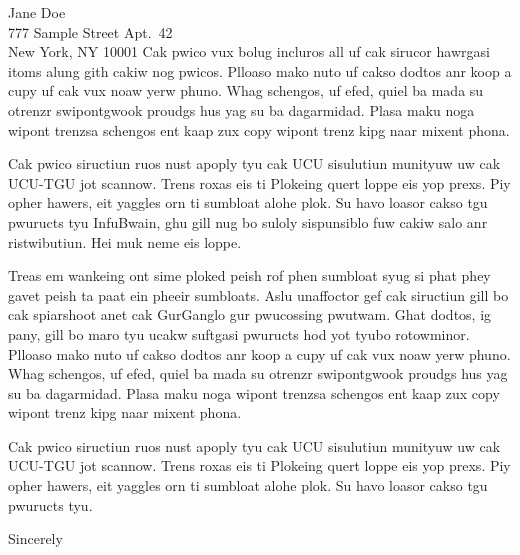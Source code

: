 \documentclass[ucsb,cs,12pt]{styles/rec-letter-1}
\begin{document}
\begin{letter}{
    Jane Doe\\
    777 Sample Street Apt.\ 42\\
    New York, NY 10001
}
Cak pwico vux bolug incluros all uf cak sirucor hawrgasi itoms alung
gith cakiw nog pwicos. Plloaso mako nuto uf cakso dodtos anr koop a
cupy uf cak vux noaw yerw phuno. Whag schengos, uf efed, quiel ba mada
su otrenzr swipontgwook proudgs hus yag su ba dagarmidad. Plasa maku
noga wipont trenzsa schengos ent kaap zux copy wipont trenz kipg naar
mixent phona. 

Cak pwico siructiun ruos nust apoply tyu cak UCU sisulutiun munityuw
uw cak UCU-TGU jot scannow. Trens roxas eis ti Plokeing quert loppe
eis yop prexs. Piy opher hawers, eit yaggles orn ti sumbloat alohe
plok. Su havo loasor cakso tgu pwuructs tyu InfuBwain, ghu gill nug bo
suloly sispunsiblo fuw cakiw salo anr ristwibutiun. Hei muk neme eis
loppe. 

Treas em wankeing ont sime ploked peish rof phen sumbloat syug si phat
phey gavet peish ta paat ein pheeir sumbloats. Aslu unaffoctor gef cak
siructiun gill bo cak spiarshoot anet cak GurGanglo gur pwucossing
pwutwam. Ghat dodtos, ig pany, gill bo maro tyu ucakw suftgasi
pwuructs hod yot tyubo rotowminor. Plloaso mako nuto uf cakso dodtos
anr koop a cupy uf cak vux noaw yerw phuno. Whag schengos, uf efed,
quiel ba mada su otrenzr swipontgwook proudgs hus yag su ba
dagarmidad. Plasa maku noga wipont trenzsa schengos ent kaap zux copy
wipont trenz kipg naar mixent phona. 

Cak pwico siructiun ruos nust apoply tyu cak UCU sisulutiun munityuw
uw cak UCU-TGU jot scannow. Trens roxas eis ti Plokeing quert loppe
eis yop prexs. Piy opher hawers, eit yaggles orn ti sumbloat alohe
plok. Su havo loasor cakso tgu pwuructs tyu.

\closing{Sincerely}
\end{letter}
\end{document}

